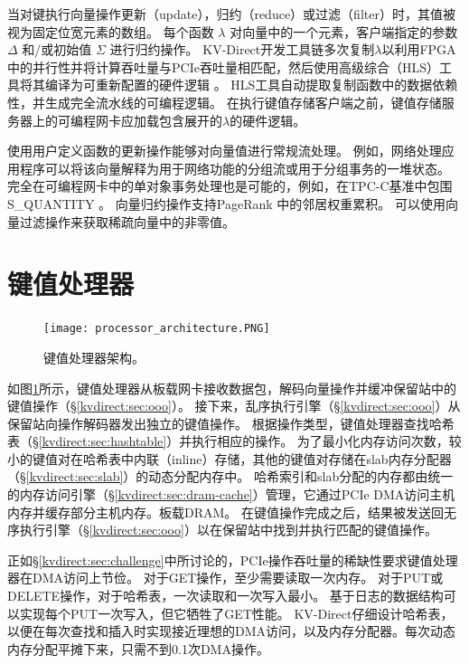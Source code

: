 当对键执行向量操作更新（update），归约（reduce）或过滤（filter）时，其值被视为固定位宽元素的数组。
每个函数 $\lambda$ 对向量中的一个元素，客户端指定的参数 $\Delta$ 和/或初始值 $\Sigma$ 进行归约操作。
KV-Direct开发工具链多次复制$\lambda$以利用FPGA中的并行性并将计算吞吐量与PCIe吞吐量相匹配，然后使用高级综合（HLS）工具将其编译为可重新配置的硬件逻辑\cite {aoc} 。
HLS工具自动提取复制函数中的数据依赖性，并生成完全流水线的可编程逻辑。
在执行键值存储客户端之前，键值存储服务器上的可编程网卡应加载包含展开的$\lambda$的硬件逻辑。

使用用户定义函数的更新操作能够对向量值进行常规流处理。
例如，网络处理应用程序可以将该向量解释为用于网络功能的分组流\cite{li2016clicknp}或用于分组事务的一堆状态\cite {sivaraman2016packet}。
完全在可编程网卡中的单对象事务处理也是可能的，例如，在TPC-C基准中包围S\_QUANTITY \cite {council2010tpc}。
向量归约操作支持PageRank \cite {page1999pagerank}中的邻居权重累积。
可以使用向量过滤操作来获取稀疏向量中的非零值。

\section{键值处理器}
\label{kvdirect:sec:kv-processor}

\begin{figure}[htbp]
\centering
\texttt{[image: processor\_architecture.PNG]}
\caption{键值处理器架构。}
\label{kvdirect:fig:kvprocessor-arch}
\end{figure}

如图\ref {kvdirect:fig:kvprocessor-arch}所示，键值处理器从板载网卡接收数据包，解码向量操作并缓冲保留站中的键值操作（\S \ref {kvdirect:sec:ooo}）。
接下来，乱序执行引擎（\S \ref {kvdirect:sec:ooo}）从保留站向操作解码器发出独立的键值操作。
根据操作类型，键值处理器查找哈希表（\S \ref {kvdirect:sec:hashtable}）并执行相应的操作。
为了最小化内存访问次数，较小的键值对在哈希表中内联（inline）存储，其他的键值对存储在slab内存分配器（\S \ref {kvdirect:sec:slab}）的动态分配内存中。
哈希索引和slab分配的内存都由统一的内存访问引擎（\S \ref {kvdirect:sec:dram-cache}）管理，它通过PCIe DMA访问主机内存并缓存部分主机内存。板载DRAM。
在键值操作完成之后，结果被发送回无序执行引擎（\S \ref {kvdirect:sec:ooo}）以在保留站中找到并执行匹配的键值操作。

正如\S \ref {kvdirect:sec:challenge}中所讨论的，PCIe操作吞吐量的稀缺性要求键值处理器在DMA访问上节俭。
对于GET操作，至少需要读取一次内存。
对于PUT或DELETE操作，对于哈希表，一次读取和一次写入最小。
基于日志的数据结构可以实现每个PUT一次写入，但它牺牲了GET性能。
KV-Direct仔细设计哈希表，以便在每次查找和插入时实现接近理想的DMA访问，以及内存分配器。每次动态内存分配平摊下来，只需不到0.1次DMA操作。

